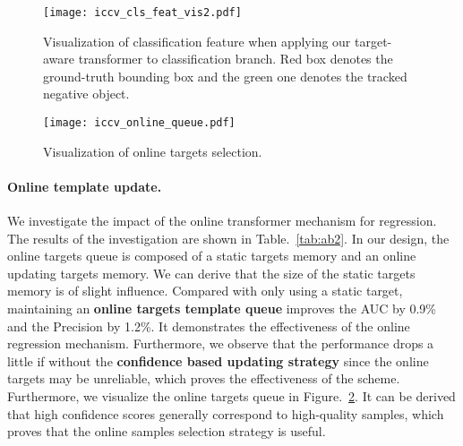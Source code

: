 \documentclass[10pt,twocolumn,letterpaper]{article}
\begin{document}
\begin{figure}[tp]
\centering
\texttt{[image: iccv\_cls\_feat\_vis2.pdf]}
\vspace{-0.4cm}
\caption{Visualization of classification feature  when applying our target-aware transformer to classification branch. Red box denotes the ground-truth bounding box and the green one denotes the tracked negative object.
}
\label{fig:cls_feat_vis}
\end{figure}

\begin{figure}[t]
\vspace{-0.2cm}
\centering
\texttt{[image: iccv\_online\_queue.pdf]}
\caption{Visualization of online targets selection. }
\label{fig:online_queue}
\end{figure}

\setlength{\tabcolsep}{8pt}
\begin{table}[pt]
\begin{center}
\fontsize{8}{9}\selectfont  
{}
\end{center}
\vspace{-0.2cm}
\caption{Analysis of online template update mechanism.} 
\label{tab:ab2}
\vspace{-0.4cm}
\end{table}


\paragraph{Online template update.}
We investigate the impact of the online transformer mechanism for regression. The results of the investigation are shown in Table.~\ref{tab:ab2}. In our design, the online targets queue is composed of a static targets memory and an online updating targets memory. We can derive that the size of the static targets memory is of slight influence. Compared with only using a static target, maintaining an \textbf{online targets template queue} improves the AUC by 0.9\% and the Precision by 1.2\%. It demonstrates the effectiveness of the online regression mechanism. Furthermore, we observe that the performance drops a little if without the \textbf{confidence based updating strategy} since the online targets may be unreliable, which proves the effectiveness of the scheme.
Furthermore, we visualize the online targets queue in Figure.~\ref{fig:online_queue}. It can be derived
that high confidence scores generally correspond to high-quality
samples, which proves that the online samples selection
strategy is useful.
\end{document}
